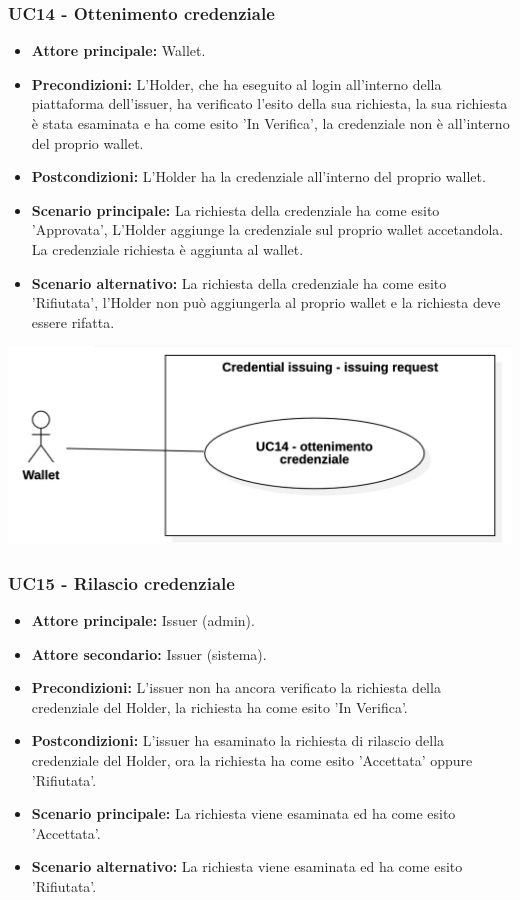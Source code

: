 \subsubsection{UC14 - Ottenimento credenziale}
\begin{itemize}
    \item \textbf{Attore principale:} Wallet.
    \item \textbf{Precondizioni:} L'Holder, che ha eseguito al login all'interno della piattaforma dell'issuer, ha verificato l'esito della sua richiesta, la sua richiesta è stata esaminata e ha come esito 'In Verifica', la credenziale non è all'interno del proprio wallet.
    \item \textbf{Postcondizioni:} L'Holder ha la credenziale all'interno del proprio wallet.
    \item \textbf{Scenario principale:} La richiesta della credenziale ha come esito 'Approvata',
    L’Holder aggiunge la credenziale sul proprio wallet accetandola.\\
    La credenziale richiesta è aggiunta al wallet.
    \item \textbf{Scenario alternativo:} La richiesta della credenziale ha come esito 'Rifiutata', l'Holder non può aggiungerla al proprio wallet e la richiesta deve essere rifatta.
\end{itemize}

\begin{center}
    \includegraphics[scale = 0.3]{./res/img/2Credential_issuing_3.png}
  \end{center}

\subsubsection{UC15 - Rilascio credenziale}
\begin{itemize}
    \item \textbf{Attore principale:} Issuer (admin).
    \item \textbf{Attore secondario:} Issuer (sistema).
    \item \textbf{Precondizioni:} L'issuer non ha ancora verificato la richiesta della credenziale del Holder, la richiesta ha come esito 'In Verifica'.
    \item \textbf{Postcondizioni:} L'issuer ha esaminato la richiesta di rilascio della credenziale del Holder, ora la richiesta ha come esito 'Accettata' oppure 'Rifiutata'.
    \item \textbf{Scenario principale:} La richiesta viene esaminata ed ha come esito 'Accettata'.
    \item \textbf{Scenario alternativo:} La richiesta viene esaminata ed ha come esito 'Rifiutata'.
\end{itemize}

